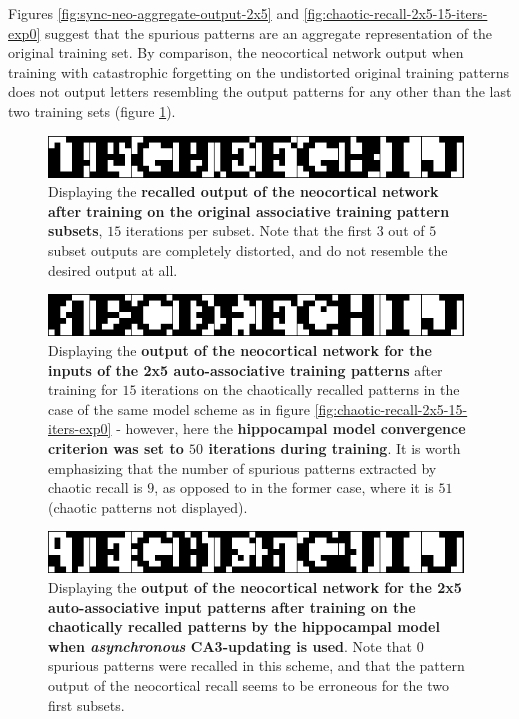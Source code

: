 Figures \ref{fig:sync-neo-aggregate-output-2x5} and \ref{fig:chaotic-recall-2x5-15-iters-exp0} suggest that the spurious patterns are an aggregate representation of the original training set. By comparison, the neocortical network output when training with catastrophic forgetting on the undistorted original training patterns does not output letters resembling the output patterns for any other than the last two training sets (figure \ref{fig:catastrophic-forgetting-2x5-neo-consolidation}).

\begin{figure}
    \centering
    \includegraphics[width=11cm]{fig/neo-consolidation/traditional-with-catastrophic-15-neo-iters}
    \caption{Displaying the \textbf{recalled output of the neocortical network after training on the original associative training pattern subsets}, $15$ iterations per subset. Note that the first $3$ out of $5$ subset outputs are completely distorted, and do not resemble the desired output at all.}
    \label{fig:catastrophic-forgetting-2x5-neo-consolidation}
\end{figure}

\begin{figure}
    \centering
    \includegraphics[width=11cm]{fig/neo-consolidation/one-2x5-run-sync-50-iters-15-neo-iters}
    \caption{Displaying the \textbf{output of the neocortical network for the inputs of the 2x5 auto-associative training patterns} after training for $15$ iterations on the chaotically recalled patterns in the case of the same model scheme as in figure \ref{fig:chaotic-recall-2x5-15-iters-exp0} - however, here the \textbf{hippocampal model convergence criterion was set to $50$ iterations during training}. It is worth emphasizing that the number of spurious patterns extracted by chaotic recall is $9$, as opposed to in the former case, where it is $51$ (chaotic patterns not displayed).}
    \label{fig:one-2x5-run-sync-50-iters-15-neo-iters}
\end{figure}

\begin{figure}
    \centering
    \includegraphics[width=11cm]{fig/neo-consolidation/one-2x5-run-async-tm1-15-iters-15-neo-iters}
    \caption{Displaying the \textbf{output of the neocortical network for the 2x5 auto-associative input patterns after training on the chaotically recalled patterns by the hippocampal model when \textit{asynchronous} CA3-updating is used}. Note that $0$ spurious patterns were recalled in this scheme, and that the pattern output of the neocortical recall seems to be erroneous for the two first subsets.}
    \label{fig:one-2x5-run-async-tm1-15-iters-15-neo-iters}
\end{figure}

